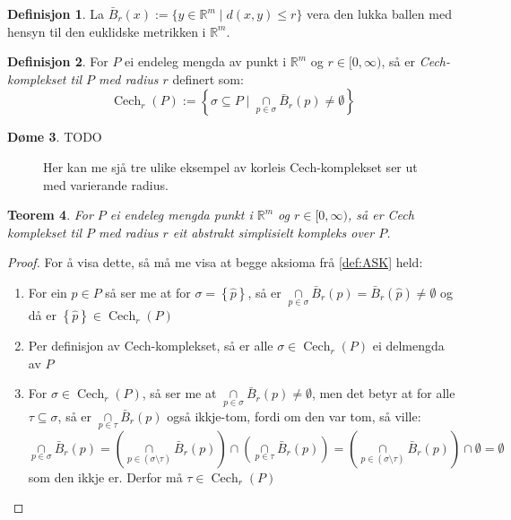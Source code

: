 \documentclass[a4paper, 12pt, norsk]{article}
\theoremstyle{plain}
\newtheorem{theorem}{Teorem}[section]
\theoremstyle{definition}
\newtheorem{definition}[theorem]{Definisjon}
\newtheorem{example}[theorem]{Døme}
\newcommand{\Rb}{\mathbb{R}}
\DeclareMathOperator{\Cech}{Cech}
\newcommand{\intersect}{ \mathop{\cap}\limits } %
\newcommand{\set}[1]{ \left \{ #1 \right \} } %
\begin{document}
\begin{definition}
	La $\bar{B}_r(x):=\{y\in\Rb^m \mid d(x, y)\leq r\}$ vera den lukka ballen med hensyn til den euklidske metrikken i $\Rb^m$.
\end{definition}

\begin{definition}
	For $P$ ei endeleg mengda av punkt i $\Rb^m$ og $r\in[0,\infty)$, så er \emph{Cech-komplekset til $P$ med radius $r$} definert som:
	\[
		\Cech_r(P):=\left\{\sigma\subseteq P \mid \intersect_{p\in\sigma}\bar{B}_r(p)\neq\emptyset\right\}
	\]
\end{definition}

\begin{example}
	TODO
	\begin{figure}[htbp]
		\begin{center}
			
		\end{center}
		\caption{Her kan me sjå tre ulike eksempel av korleis Cech-komplekset ser ut med varierande radius.}
	\end{figure}
\end{example}

\begin{theorem} \label{thm:CASK}
	For $P$ ei endeleg mengda punkt i $\Rb^m$ og $r\in[0,\infty)$, så er Cech komplekset til $P$ med radius $r$ eit abstrakt simplisielt kompleks over $P$.
\end{theorem}

\begin{proof}
	For å visa dette, så må me visa at begge aksioma frå \autoref{def:ASK} held:
	\begin{enumerate}
		\item{ For ein \( \hat{p} \in P \) så ser me at for \( \sigma = \set{\hat{p}} \), så er \( \intersect_{p\in\sigma}\bar{B}_r(p)=\bar{B}_r(\hat{p})\neq\emptyset \) og då er \( \set{\hat{p}} \in \Cech_r(P) \) }
		\item{ Per definisjon av Cech-komplekset, så er alle \( \sigma \in \Cech_r(P) \) ei delmengda av \( P \) }
		\item{ For \( \sigma \in \Cech_r(P) \), så ser me at \( \intersect_{p\in\sigma} \bar{B}_r(p) \neq \emptyset \), men det betyr at for alle \( \tau \subseteq \sigma \), så er \( \intersect_{p\in\tau} \bar{B}_r(p) \) også ikkje-tom, fordi om den var tom, så ville: 
			\[ 
				\intersect_{p\in\sigma} \bar{B}_r(p) = \left( \intersect_{p\in(\sigma\setminus\tau)} \bar{B}_r(p) \right) \intersect \left( \intersect_{p\in\tau} \bar{B}_r(p) \right) = \left( \intersect_{p\in(\sigma\setminus\tau)} \bar{B}_r(p) \right) \intersect \emptyset = \emptyset 
			\] 
			som den ikkje er. Derfor må \( \tau \in \Cech_r(P) \) }
	\end{enumerate}
\end{proof}
\end{document}

